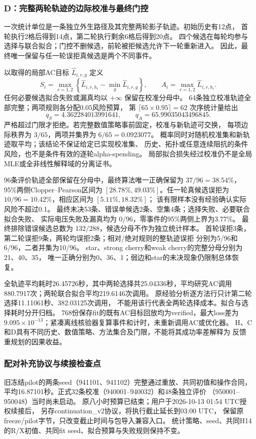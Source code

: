 \documentclass[UTF8,fontset=fandol,11pt,a4paper]{ctexart}
\begin{document}
\subsubsection{D：完整两轮轨迹的边际校准与最终门控}
\label{sec:D-audited}
一次统计单位是一条独立外生路径及其完整两轮影子轨迹。初始历史有12点，
首轮执行2格后得到14点，第二轮执行剩余6格后得到20点。
四个候选在每轮均参与选择与联合拟合；门控不删候选，前轮被拒候选允许下一轮重新进入。
因此，最终唯一保留与任一轮误拒真候选是两个不同事件。

以取得的局部AC目标 $\widehat L_{i,r,g}$ 定义
\[
 S_i=\max_{r=1,2}\left\{\widehat L_{i,r,h_i}-\min_g\widehat L_{i,r,g}\right\},
 \qquad A_i=\max_{r=1,2}\widehat L_{i,r,h_i}.
\]
任何必要候选拟合失败或漏真均以 $+\infty$ 保留在校准分母中。
64条独立校准轨迹全部完整；两项规则各分配0.05风险预算，
第 $\lceil65\times0.95\rceil=62$ 次序统计量给出
\[
 q_S=4.362284013991641,\qquad q_A=65.99035043496845.
\]
严格超过门限才拒绝。若完整数值策略事前固定，校准与新轨迹可交换，
每项边际秩界为 $3/65$，两项并集界为 $6/65=0.0923077$。
概率同时对随机校准集和新轨迹取平均；该结论不保证给定已实现校准集、
历史、拓扑或任意连续阻抗的条件风险，也不是条件有效的逐轮alpha-spending。
局部拟合损失经过校准仍不是全局MLE或全非线性解释域的分离证书。

96条评价轨迹全部保留在分母中，最终算法唯一正确保留为
$37/96=38.54\%$，95\%两侧Clopper--Pearson区间为
$[28.78\%,49.03\%]$。任一轮真候选误拒为
$10/96=10.42\%$，相应区间为 $[5.11\%,18.32\%]$；
该有限样本没有经验确认实际风险不超过0.1。
最终未决53条、错误单候选2条、空集4条；选择失败、必要联合拟合失败、
实际电压失败及漏真均为 $0/96$，零事件的95\%两侧上界为3.77\%。
最终排除错误候选总数为 $132/288$，候选分母不作为独立统计样本。
首轮误拒3条，第二轮误拒9条，两轮均误拒2条；相对/绝对规则的整轨迹误拒
分别为5/96和6/96，二者并集为10/96。
star、strong cherry和weak cherry的完整分母分别为21、40、35，
唯一正确分别为0、36、1；弱边和star的未决现象仍限制总体恢复。

全轨迹平均耗时26.45726秒，其中两轮选择共25.04336秒，平均研究AC调用
880.7917次；两轮联合拟合平均219.6146次调用。
原经验分析逐方法行只计第二轮选择11.11061秒、382.03125次调用，
不能用该行代表全两轮选择成本。拟合与选择耗时分开归档。
768份保存fit的既有AC目标回放均为verified，最大loss差为
$9.095\times10^{-13}$；紧凑离线核验器复算事件和计时，未重新调用AC或优化器。
H、C和D具有不同历史、数值策略、方法集合及门限，不能将其成功率差解释为
反馈重规划的因果收益。


\subsubsection{配对补充协议与续接检查点}
\label{sec:paired-D-checkpoint}
旧冻结pilot的两条seed（941101、941102）完整通过重放、共同初值和操作合同，
平均16.87101秒。正式32条校准（940001--940032）和48条独立评价
（950001--950048）当时尚未启动。
原八小时预算已结束；用户于2026-10-13 01:54 UTC授权续接后，
另存continuation\_v2协议，将执行截止延长到03:00 UTC，
保留原freeze/pilot字节，只改变截止时间与包导入兼容入口。
统计策略、seed、共同H14的R/X初值、共同fit seed、拟合预算与失败规则保持不变。
\end{document}
